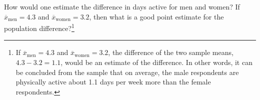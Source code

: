 \begin{spacing}{1.5}

\begin{exercise} \label{peOfDiffActiveBetweenGender}
	How would one estimate the difference in days active for men and women? If $\overline{x}_{\text{men}} = 4.3$ and $\overline{x}_{\text{women}} = 3.2$, then what is a good point estimate for the population difference?\footnote{If $\overline{x}_{\text{men}} = 4.3$ and $\overline{x}_{\text{women}} = 3.2$, the difference of the two sample means, $4.3 - 3.2 = 1.1$, would be an estimate of the difference. In other words, it can be concluded from the sample that on average, the male respondents are physically active about 1.1 days per week more than the female respondents.}
\end{exercise}


\end{spacing}
